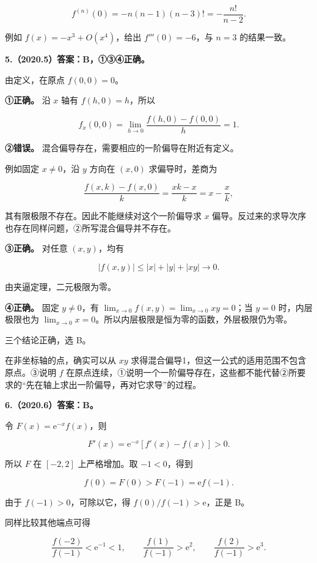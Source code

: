\documentclass[UTF8,11pt,fontset=windows]{ctexart}
\begin{document}
$$
f^{(n)}(0)=-n(n-1)(n-3)!
=\boxed{-\frac{n!}{n-2}}.
$$

例如 $f(x)=-x^3+O(x^4)$，给出 $f'''(0)=-6$，与 $n=3$ 的结果一致。

\clearpage

\textbf{5.（2020.5）答案：B，①③④正确。}

由定义，在原点 $f(0,0)=0$。

\textbf{①正确。} 沿 $x$ 轴有 $f(h,0)=h$，所以

$$
f_x(0,0)=\lim_{h\to0}\frac{f(h,0)-f(0,0)}h=1.
$$

\textbf{②错误。} 混合偏导存在，需要相应的一阶偏导在附近有定义。

例如固定 $x\ne0$，沿 $y$ 方向在 $(x,0)$ 求偏导时，差商为

$$
\frac{f(x,k)-f(x,0)}k
=\frac{xk-x}{k}=x-\frac xk,
$$

其有限极限不存在。因此不能继续对这个一阶偏导求 $x$ 偏导。反过来的求导次序也存在同样问题，②所写混合偏导并不存在。

\textbf{③正确。} 对任意 $(x,y)$，均有

$$
|f(x,y)|\le|x|+|y|+|xy|\longrightarrow0.
$$

由夹逼定理，二元极限为零。

\textbf{④正确。} 固定 $y\ne0$，有 $\lim_{x\to0}f(x,y)=\lim_{x\to0}xy=0$；当 $y=0$ 时，内层极限也为 $\lim_{x\to0}x=0$。所以内层极限是恒为零的函数，外层极限仍为零。

三个结论正确，选 B。

在非坐标轴的点，确实可以从 $xy$ 求得混合偏导1，但这一公式的适用范围不包含原点。③说明 $f$ 在原点连续，①说明一个一阶偏导存在，这些都不能代替②所要求的“先在轴上求出一阶偏导，再对它求导”的过程。

\clearpage

\textbf{6.（2020.6）答案：B。}

令 $F(x)=\mathrm e^{-x}f(x)$，则

$$
F'(x)=\mathrm e^{-x}[f'(x)-f(x)]>0.
$$

所以 $F$ 在 $[-2,2]$ 上严格增加。取 $-1<0$，得到

$$
f(0)=F(0)>F(-1)=\mathrm e f(-1).
$$

由于 $f(-1)>0$，可除以它，得 $f(0)/f(-1)>\mathrm e$，正是 B。

同样比较其他端点可得

$$
\frac{f(-2)}{f(-1)}<\mathrm e^{-1}<1,
\qquad
\frac{f(1)}{f(-1)}>\mathrm e^2,
\qquad
\frac{f(2)}{f(-1)}>\mathrm e^3.
$$
\end{document}
